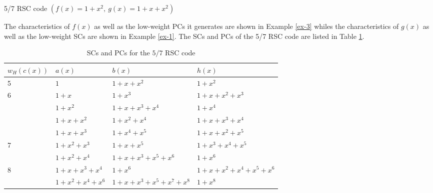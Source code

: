 \begin{example} {5/7 RSC code $\left(f(x)=1+x^2,~g(x)=1+x+x^2\right)$}
	
	The characteristics of $f(x)$ as well as the low-weight PCs it generates are shown in Example \ref{ex-3}  whiles the characteristics of $g(x)$ as well as the low-weight SCs are shown in  Example \ref{ex-1}. The SCs and PCs of the 5/7 RSC code are listed in Table \ref{novelTab13}. 
	\begin{table}[htbp]
		\caption{SCs and PCs for the $5/7$ RSC code}
		\centering
		\begin{tabularx}{0.75\textwidth}{Xlll} 
			\toprule
			$w_H(c(x))$& $a(x)$ & $b(x)$ & $h(x)$ \\ %
			\midrule
			5&$1$ & $1+x+x^{2}$ & $1+x^2$\\
			\hline
			6&$1+x$ & $1+x^3$ & $1+x+x^2+x^3$\\
			\hline
			&$1+x^2$ & $1+x+x^3+x^4$ & $1+x^{4}$\\
			\hline
			&$1+x+x^2$ & $1+x^2+x^4$ & $1+x+x^3+x^4$\\
			\hline
			&$1+x+x^3$ & $1+x^4+x^5$ & $1+x+x^2+x^5$\\
			\hline
			7&$1+x^2+x^3$ & $1+x+x^5$ & $1+x^3+x^4+x^5$\\
			\hline
			&$1+x^2+x^4$ & $1+x+x^3+x^5+x^6$ & $1+x^{6}$\\			
			\hline
			8&$1+x+x^3+x^4$ & $1+x^6$ & $1+x+x^2+x^4+x^5+x^6$\\
			\hline
			&$1+x^2+x^4+x^6$ & $1+x+x^3+x^5+x^7+x^8$ & $1+x^8$\\
			
			\bottomrule
		\end{tabularx}
		
		\label{novelTab13}
	\end{table}
\end{example}

